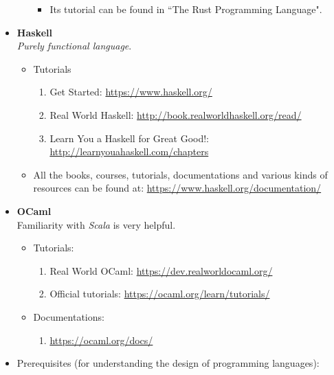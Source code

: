 \documentclass{article}
\begin{document}
\begin{itemize}
\begin{itemize}
\begin{itemize}
            \item Its tutorial can be found in ``The Rust Programming Language".
        \end{itemize}
    \end{itemize}
    \item \textbf{Haskell}\\
    \emph{Purely functional language}.
    \begin{itemize}
        \item Tutorials
        \begin{enumerate}
            \item Get Started:
            \href{https://www.haskell.org/}{https://www.haskell.org/}
            \item Real World Haskell:
            \href{http://book.realworldhaskell.org/read/}{http://book.realworldhaskell.org/read/}
            \item Learn You a Haskell for Great Good!:
            \href{http://learnyouahaskell.com/chapters}{http://learnyouahaskell.com/chapters}
        \end{enumerate}
        \item All the books, courses, tutorials, documentations and various kinds of resources can be found at:
        \href{https://www.haskell.org/documentation/}{https://www.haskell.org/documentation/}
    \end{itemize}
    \item \textbf{OCaml}\\
    Familiarity with \emph{Scala} is very helpful.
    \begin{itemize}
        \item Tutorials:
        \begin{enumerate}
            \item Real World OCaml:
            \href{https://dev.realworldocaml.org/}{https://dev.realworldocaml.org/}
            \item Official tutorials: \href{https://ocaml.org/learn/tutorials/}{https://ocaml.org/learn/tutorials/}
        \end{enumerate}
        \item Documentations:
        \begin{enumerate}
            \item \href{https://ocaml.org/docs/}{https://ocaml.org/docs/}
        \end{enumerate}        
    \end{itemize}
    \item Prerequisites (for understanding the design of programming languages):

\end{itemize}
\end{document}
